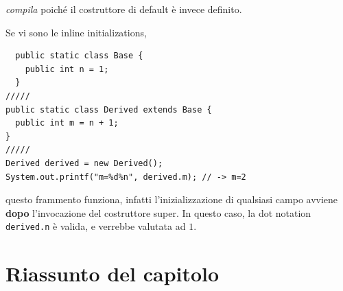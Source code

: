 \documentclass[\fontsizeclass,twocolumn]{\classname}
\theoremstyle{definition}
\theoremstyle{definition}
\begin{document}
\emph{compila} poiché il costruttore di default è invece definito.

Se vi sono le inline initializations,

\begin{lstlisting}
  public static class Base {
    public int n = 1;
  }
/////
public static class Derived extends Base {
  public int m = n + 1;
}
/////
Derived derived = new Derived();
System.out.printf("m=%d%n", derived.m); // -> m=2
\end{lstlisting}

questo frammento funziona, infatti l'inizializzazione di qualsiasi campo avviene
\textbf{dopo} l'invocazione del costruttore super. In questo caso, la dot
notation \texttt{derived.n} è valida, e verrebbe valutata ad $1$.

\section{Riassunto del capitolo}
\end{document}
